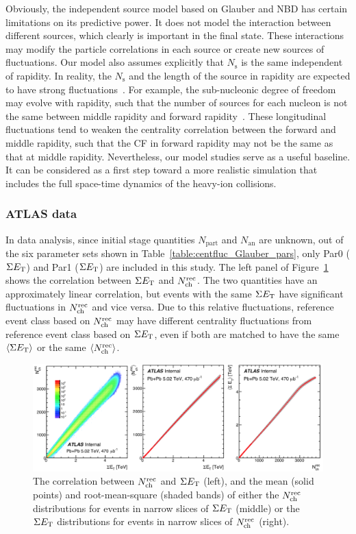 Obviously, the independent source model based on Glauber and NBD has certain limitations on its predictive power. It does not model the interaction between different sources, which clearly is important in the final state. These interactions may modify the particle correlations in each source or create new sources of fluctuations. Our model also assumes explicitly that $N_\text{s}$ is the same independent of rapidity. In reality, the $N_\text{s}$ and the length of the source in rapidity are expected to have strong fluctuations~\cite{Bozek:2015bna, Pang:2015zrq, Schenke:2016ksl}. For example, the sub-nucleonic degree of freedom may evolve with rapidity, such that the number of sources for each nucleon is not the same between middle rapidity and forward rapidity~\cite{Schenke:2016ksl, Jia:2015jga}. These longitudinal fluctuations tend to weaken the centrality correlation between the forward and middle rapidity, such that the CF in forward rapidity may not be the same as that at middle rapidity. Nevertheless, our model studies serve as a useful baseline. It can be considered as a first step toward a more realistic simulation that includes the full space-time dynamics of the heavy-ion collisions.



\subsubsection{ATLAS data}

In data analysis, since initial stage quantities $N_\text{part}$ and $N_\text{an}$ are unknown, out of the six parameter sets shown in Table~\ref{table:centfluc_Glauber_pars}, only Par0 ($\Sigma E_\text{T}$) and Par1 ($\Sigma E_\text{T}$) are included in this study. The left panel of Figure~\ref{fig:centfluc_ATLAS_corr_Et_Nch} shows the correlation between $\Sigma E_\text{T}$ and $N_\text{ch}^\text{rec}$. The two quantities have an approximately linear correlation, but events with the same $\Sigma E_\text{T}$ have significant fluctuations in $N_\text{ch}^\text{rec}$ and vice versa. Due to this relative fluctuations, reference event class based on $N_\text{ch}^\text{rec}$ may have different centrality fluctuations from reference event class based on $\Sigma E_\text{T}$, even if both are matched to have the same $\left\langle \Sigma E_\text{T}\right\rangle$ or the same $\left\langle N_\text{ch}^\text{rec}\right\rangle$.

\begin{figure}[H]
\centering
\includegraphics[width=.95\linewidth]{figs/chapter_centfluc/ATLAS_corr_Et_Nch.png}
\caption{The correlation between $N_\text{ch}^\text{rec}$ and $\Sigma E_\text{T}$ (left), and the mean (solid points) and root-mean-square (shaded bands) of either the $N_\text{ch}^\text{rec}$ distributions for events in narrow slices of $\Sigma E_\text{T}$ (middle) or the $\Sigma E_\text{T}$ distributions for events in narrow slices of $N_\text{ch}^\text{rec}$ (right).}
\label{fig:centfluc_ATLAS_corr_Et_Nch}
\end{figure}

